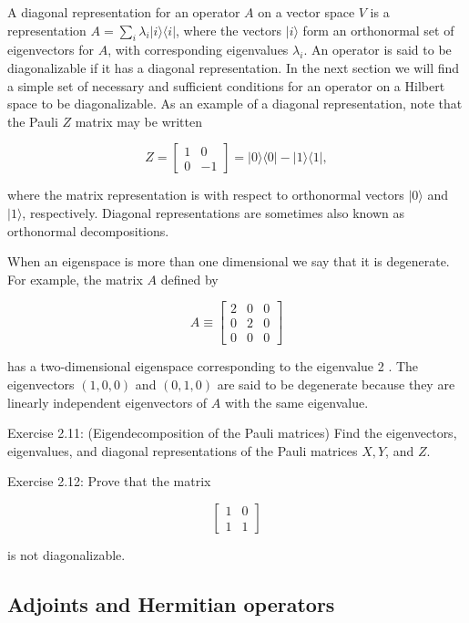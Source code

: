 \documentclass[
	11pt, %
	fleqn, %
	a4paper, %
]{LegrandOrangeBook}
\begin{document}
A diagonal representation for an operator $A$ on a vector space $V$ is a representation $A=\sum_{i} \lambda_{i}|i\rangle\langle i|$, where the vectors $|i\rangle$ form an orthonormal set of eigenvectors for $A$, with corresponding eigenvalues $\lambda_{i}$. An operator is said to be diagonalizable if it has a diagonal representation. In the next section we will find a simple set of necessary and sufficient conditions for an operator on a Hilbert space to be diagonalizable. As an example of a diagonal representation, note that the Pauli $Z$ matrix may be written

$$
Z=\left[\begin{array}{rr}
1 & 0 \\
0 & -1
\end{array}\right]=|0\rangle\langle 0|-| 1\rangle\langle 1|,
$$

where the matrix representation is with respect to orthonormal vectors $|0\rangle$ and $|1\rangle$, respectively. Diagonal representations are sometimes also known as orthonormal decompositions.

When an eigenspace is more than one dimensional we say that it is degenerate. For example, the matrix $A$ defined by

$$
A \equiv\left[\begin{array}{lll}
2 & 0 & 0 \\
0 & 2 & 0 \\
0 & 0 & 0
\end{array}\right]
$$

has a two-dimensional eigenspace corresponding to the eigenvalue 2 . The eigenvectors $(1,0,0)$ and $(0,1,0)$ are said to be degenerate because they are linearly independent eigenvectors of $A$ with the same eigenvalue.

Exercise 2.11: (Eigendecomposition of the Pauli matrices) Find the eigenvectors, eigenvalues, and diagonal representations of the Pauli matrices $X, Y$, and $Z$.

Exercise 2.12: Prove that the matrix

$$
\left[\begin{array}{ll}
1 & 0 \\
1 & 1
\end{array}\right]
$$

is not diagonalizable.

\subsection{Adjoints and Hermitian operators}
\end{document}
